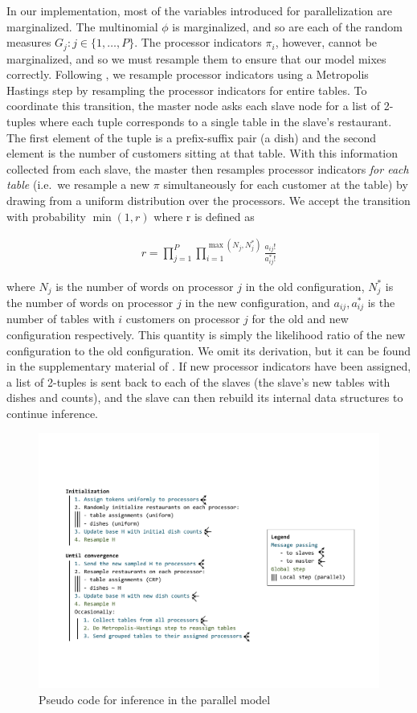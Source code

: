 In our implementation, most of the variables introduced for
parallelization are marginalized. The multinomial $\phi$ is
marginalized, and so are each of the random measures $G_j : j \in \{1,
\ldots, P\}$. The processor indicators $\pi_i$, however, cannot be
marginalized, and so we must resample them to ensure that our model
mixes correctly. Following \cite{williamson2013}, we resample
processor indicators using a Metropolis Hastings step by resampling
the processor indicators for entire tables. To coordinate this
transition, the master node asks each slave node for a list of
2-tuples where each tuple corresponds to a single table in the slave's
restaurant. The first element of the tuple is a prefix-suffix pair (a
dish) and the second element is the number of customers sitting at
that table. With this information collected from each slave, the
master then resamples processor indicators \textit{for each table}
(i.e.~we resample a new $\pi$ simultaneously for each customer at the
table) by drawing from a uniform distribution over the processors. We
accept the transition with probability $\min(1, r)$ where r is defined
as

\begin{align}
  r = \prod_{j = 1}^P \prod_{i=1}^{\max(N_j, N_j^*)} \frac{a_{ij}!}{a_{ij}^*!}
\end{align}

where $N_j$ is the number of words on processor $j$ in the old
configuration, $N_j^*$ is the number of words on processor $j$ in the
new configuration, and $a_{ij}, a_{ij}^*$ is the number of tables with
$i$ customers on processor $j$ for the old and new configuration
respectively. This quantity is simply the likelihood ratio of the new
configuration to the old configuration. We omit its derivation, but it
can be found in the supplementary material of
\cite{williamson2013}. If new processor indicators have been assigned,
a list of 2-tuples is sent back to each of the slaves (the slave's new
tables with dishes and counts), and the slave can then rebuild its
internal data structures to continue inference.

\begin{figure}[h]
  \centering
  \includegraphics[width=1.05\textwidth]{fig/parallel_code_schema}
  \caption{Pseudo code for inference in the parallel model}
  \label{fig:inference}
\end{figure}
